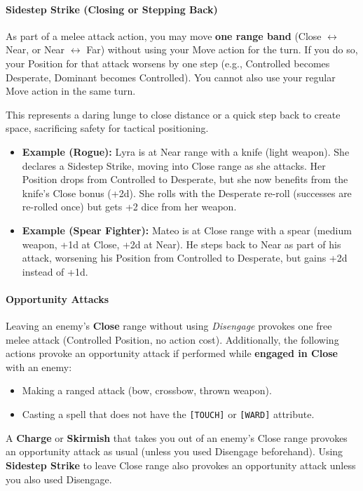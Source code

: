 \paragraph{Sidestep Strike (Closing or Stepping Back)}
\label{sec:sidestep-strike}

As part of a melee attack action, you may move \textbf{one range band} (Close $\leftrightarrow$ Near, or Near $\leftrightarrow$ Far) without using your Move action for the turn. If you do so, your Position for that attack worsens by one step (e.g., Controlled becomes Desperate, Dominant becomes Controlled). You cannot also use your regular Move action in the same turn.

\noindent This represents a daring lunge to close distance or a quick step back to create space, sacrificing safety for tactical positioning.

\begin{itemize}
  \item \textbf{Example (Rogue):} Lyra is at Near range with a knife (light weapon). She declares a Sidestep Strike, moving into Close range as she attacks. Her Position drops from Controlled to Desperate, but she now benefits from the knife's Close bonus (+2d). She rolls with the Desperate re-roll (successes are re-rolled once) but gets +2 dice from her weapon.
  \item \textbf{Example (Spear Fighter):} Mateo is at Close range with a spear (medium weapon, +1d at Close, +2d at Near). He steps back to Near as part of his attack, worsening his Position from Controlled to Desperate, but gains +2d instead of +1d.
\end{itemize}

\paragraph{Opportunity Attacks}
\label{sec:opportunity-attacks}
Leaving an enemy's \textbf{Close} range without using \textit{Disengage} provokes one free melee attack (Controlled Position, no action cost). Additionally, the following actions provoke an opportunity attack if performed while \textbf{engaged in Close} with an enemy:
\begin{itemize}
  \item Making a ranged attack (bow, crossbow, thrown weapon).
  \item Casting a spell that does not have the \texttt{[TOUCH]} or \texttt{[WARD]} attribute.
\end{itemize}
A \textbf{Charge} or \textbf{Skirmish} that takes you out of an enemy's Close range provokes an opportunity attack as usual (unless you used Disengage beforehand). Using \textbf{Sidestep Strike} to leave Close range also provokes an opportunity attack unless you also used Disengage.

